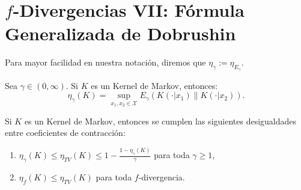 \section{$f$-Divergencias VII: F\'ormula Generalizada de Dobrushin}

\begin{notation}\cite{asoodeh2020contraction,cohen1998comparisons}
    Para mayor facilidad en nuestra notaci\'on, diremos que $\eta_\gamma:=\eta_{E_\gamma}$.
\end{notation}

\begin{theorem}\cite{asoodeh2020contraction,cohen1998comparisons}
Sea $\gamma\in(0,\infty)$. Si $K$ es un Kernel de Markov, entonces:
\begin{equation*}
    \eta_\gamma(K)=\sup_{x_1,x_2\in\mathcal{X}}E_\gamma(K(\cdot|x_1)\|K(\cdot|x_2)).
\end{equation*}
\end{theorem}

\begin{theorem}\cite{asoodeh2020contraction,cohen1998comparisons}
    Si $K$ es un Kernel de Markov, entonces se cumplen las siguientes desigualdades entre coeficientes de contracci\'on:
    \begin{enumerate}[label=(\alph*)]
        \item $\eta_\gamma(K)\leq\eta_{TV}(K)\leq1-\displaystyle{\frac{1-\eta_\gamma(K)}{\gamma}}$ para toda $\gamma\geq1$,
        \item $\eta_f(K)\leq\eta_{TV}(K)$ para toda $f$-divergencia.
    \end{enumerate}
\end{theorem}
